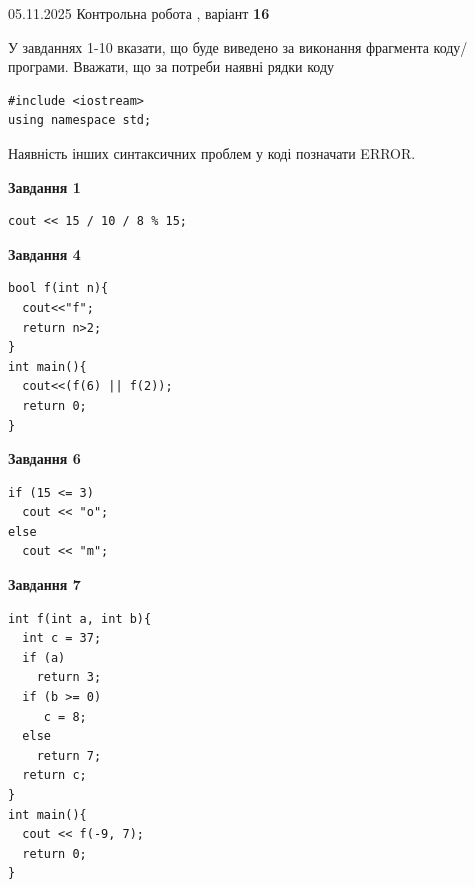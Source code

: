 \documentclass[12pt, ukrainian]{article}
\begin{document}
{\Large{05.11.2025 Контрольна робота , варіант  \No \textbf { 16 }\par}}
{
\begin {large}
У завданнях 1-10 вказати, що буде виведено за виконання фрагмента коду/про\-гра\-ми.
Вважати, що за потреби наявні рядки коду
\begin{verbatim}
#include <iostream>
using namespace std;
\end{verbatim}
Наявність інших синтаксичних проблем у коді позначати ERROR.

\begin{minipage}[t]{7.0cm}

\begin{center}
\textbf{Завдання 1}
\end{center}
\vspace{-8mm}

\begin{verbatim}
cout << 15 / 10 / 8 % 15;
\end{verbatim}



\begin{center}
\textbf{Завдання 4}
\end{center}
\vspace{-8mm}

\begin{verbatim}
bool f(int n){
  cout<<"f";
  return n>2;
}
int main(){
  cout<<(f(6) || f(2));
  return 0;
}
\end{verbatim}



\begin{center}
\textbf{Завдання 6}
\end{center}
\vspace{-8mm}

\begin{verbatim}
if (15 <= 3)
  cout << "o";
else
  cout << "m";
\end{verbatim}



\begin{center}
\textbf{Завдання 7}
\end{center}
\vspace{-8mm}

\begin{verbatim}
int f(int a, int b){
  int c = 37;
  if (a)
    return 3;
  if (b >= 0)
     c = 8;
  else
    return 7;
  return c;
}
int main(){
  cout << f(-9, 7);
  return 0;
}
\end{verbatim}


\end{minipage}
\end{large}}
\end{document}
